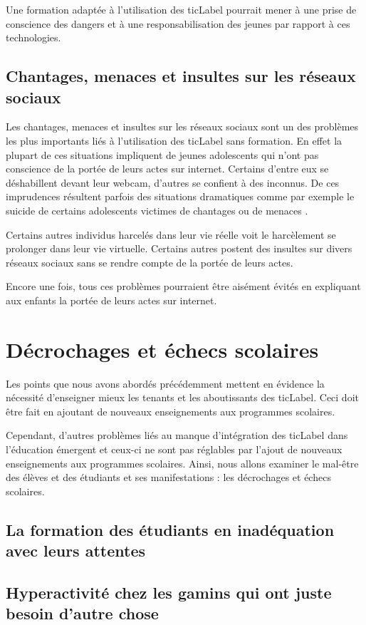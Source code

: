 Une formation adaptée à l'utilisation des \gls{ticLabel} pourrait mener à une prise de conscience des dangers et à une responsabilisation des jeunes par rapport à ces technologies.

\subsection{Chantages, menaces et insultes sur les réseaux sociaux}
Les chantages, menaces et insultes sur les réseaux sociaux sont un des problèmes les plus importants liés à l'utilisation des \gls{ticLabel} sans formation. En effet la plupart de ces situations impliquent de jeunes adolescents qui n'ont pas conscience de la portée de leurs actes sur internet. Certains d'entre eux se déshabillent devant leur webcam, d'autres se confient à des inconnus. De ces imprudences résultent parfois des situations dramatiques comme par exemple le suicide de certains adolescents victimes de chantages ou de menaces \cite{chantage_facebook, harcel_facebook}.

Certains autres individus harcelés dans leur vie réelle voit le harcèlement se prolonger dans leur vie virtuelle. Certains autres postent des insultes sur divers réseaux sociaux sans se rendre compte de la portée de leurs actes.

Encore une fois, tous ces problèmes pourraient être aisément évités en expliquant aux enfants la portée de leurs actes sur internet.



\section{Décrochages et échecs scolaires}
Les points que nous avons abordés précédemment mettent en évidence la nécessité d'enseigner mieux les tenants et les aboutissants des \gls{ticLabel}. Ceci doit être fait en ajoutant de nouveaux enseignements aux programmes scolaires.

Cependant, d'autres problèmes liés au manque d'intégration des \gls{ticLabel} dans l'éducation émergent et ceux-ci ne sont pas réglables par l'ajout de nouveaux enseignements aux programmes scolaires. Ainsi, nous allons examiner le mal-être des élèves et des étudiants et ses manifestations : les décrochages et échecs scolaires.

\subsection{La formation des étudiants en inadéquation avec leurs attentes}


\subsection{Hyperactivité chez les gamins qui ont juste besoin d'autre chose}

